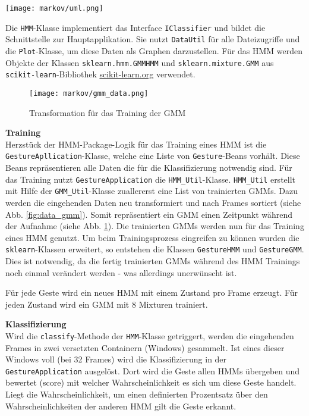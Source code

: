 \begin{figure*}[htbp] \centering
    \texttt{[image: markov/uml.png]}
    \caption{Klassendiagram und Abhängigkeiten des \acl{HMM} Klassifikators}
    \label{fig:uml}
\end{figure*}


Die \texttt{HMM}-Klasse implementiert das Interface \texttt{IClassifier} und bildet die Schnittstelle zur Hauptapplikation. Sie nutzt \texttt{DataUtil}
 für alle Dateizugriffe und die \texttt{Plot}-Klasse, um diese Daten als Graphen darzustellen. 
Für das \acl{HMM} werden Objekte der Klassen \texttt{sklearn.hmm.GMMHMM} und \texttt{sklearn.mixture.GMM} aus \texttt{scikit-learn}-Bibliothek \url{scikit-learn.org} verwendet.


\begin{figure}[htbp] \centering
    \texttt{[image: markov/gmm\_data.png]}
    \caption{Transformation für das Training der \acl{GMM}}
    \label{fig:gmm_data}
\end{figure}

\textbf{Training} \\
Herzstück der HMM-Package-Logik für das Training eines \acl{HMM} ist die \texttt{GestureApllication}-Klasse, welche eine Liste von \texttt{Gesture}-Beans vorhält. 
Diese Beans repräsentieren alle Daten die für 
 die Klassifizierung notwendig sind. Für das Training nutzt \texttt{GestureApplication} die \texttt{HMM\_Util}-Klasse.
\texttt{HMM\_Util} erstellt mit Hilfe der \texttt{GMM\_Util}-Klasse zuallererst eine List von trainierten \acl{GMM}s. Dazu werden die eingehenden Daten 
neu transformiert und nach Frames sortiert (siehe Abb. \ref{fig:data_gmm}). Somit repräsentiert ein \acl{GMM} einen Zeitpunkt während der Aufnahme 
(siehe Abb. \ref{fig:gmm_data}). Die trainierten \acl{GMM}s werden nun für das Training eines \acl{HMM} genutzt. Um beim Trainingsprozess eingreifen zu können
wurden die \texttt{sklearn}-Klassen erweitert, so entstehen die Klassen \texttt{GestureHMM} und \texttt{GestureGMM}. Dies ist notwendig, da die fertig trainierten
\acl{GMM}s während des \acl{HMM} Trainings noch einmal verändert werden - was allerdings unerwünscht ist.

Für jede Geste wird ein neues \acl{HMM} mit einem Zustand pro Frame erzeugt. Für jeden Zustand wird ein \acl{GMM} mit 8 Mixturen trainiert.


\textbf{Klassifizierung} \\
Wird die \texttt{classify}-Methode der \texttt{HMM}-Klasse getriggert, werden die eingehenden Frames in zwei versetzten Containern (Windows) gesammelt.
Ist eines dieser Windows voll (bei 32 Frames) wird die Klassifizierung in der \texttt{GestureApplication} ausgelöst. Dort wird die Geste allen \acl{HMM}s übergeben und
bewertet (score) mit welcher Wahrscheinlichkeit es sich um diese Geste handelt. Liegt die Wahrscheinlichkeit, um einen definierten Prozentsatz über den Wahrscheinlichkeiten
der anderen \acl{HMM} gilt die Geste erkannt.

